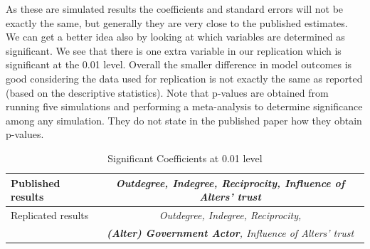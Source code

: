 \documentclass[12pt]{article} %
\numberwithin{equation}{section}		%
\numberwithin{figure}{section}			%
\numberwithin{table}{section}				%
\begin{document}
As these are simulated results the coefficients and standard errors will not be exactly the same, but generally they are very close to the published estimates. We can get a better idea also by looking at which variables are determined as significant. We see that there is one extra variable in our replication which is significant at the 0.01 level. Overall the smaller difference in model outcomes is good considering the data used for replication is not exactly the same as reported (based on the descriptive statistics). Note that p-values are obtained from running five simulations and performing a meta-analysis to determine significance among any simulation. They do not state in the published paper how they obtain p-values.

\begin{table}[!ht]
 	   \caption{\label{tab06} Significant Coefficients at 0.01 level}
 	\centering
 	\begin{tabular}{lc}
 		\hline
 		Published results & \textit{Outdegree, Indegree, Reciprocity, Influence of Alters' trust} \\ 	
 		\hline
 		\hline
 		Replicated results & \textit{Outdegree, Indegree, Reciprocity,} \\
 		& \textit{\textbf{(Alter) Government Actor}, Influence of Alters' trust} \\
 		\hline
 	\end{tabular}
\end{table}

\end{document}
